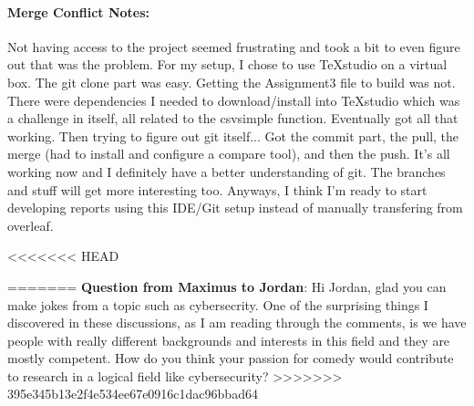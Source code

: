 	\paragraph*{\textbf{Merge Conflict Notes:}}
	
	
	Not having access to the project seemed frustrating and took a bit to even figure out that was the problem. For my setup, I chose to use TeXstudio on a virtual box. The git clone part was easy. Getting the Assignment3 file to build was not. There were dependencies I needed to download/install into TeXstudio which was a challenge in itself, all related to the csvsimple function. Eventually got all that working. Then trying to figure out git itself... Got the commit part, the pull, the merge (had to install and configure a compare tool), and then the push. It's all working now and I definitely have a better understanding of git. The branches and stuff will get more interesting too. Anyways, I think I'm ready to start developing reports using this IDE/Git setup instead of manually transfering from overleaf.
		
	
%

<<<<<<< HEAD
 
=======
\textbf{Question from Maximus to Jordan}: Hi Jordan, glad you can make jokes from a topic such as cybersecrity. One of the surprising things I discovered in these discussions, as I am reading through the comments, is we have people with really different backgrounds and interests in this field and they are mostly competent. How do you think your passion for comedy would contribute to research in a logical field like cybersecurity?
>>>>>>> 395e345b13e2f4e534ee67e0916c1dac96bbad64
